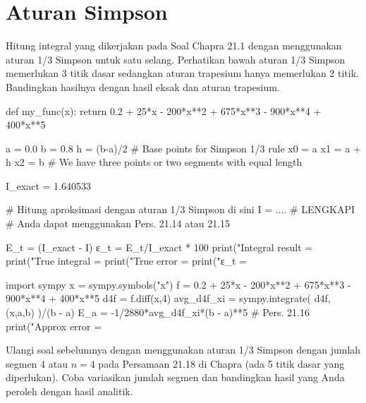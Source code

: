 \section{Aturan Simpson}

\begin{soal}
Hitung integral yang dikerjakan pada Soal Chapra 21.1 dengan menggunakan aturan 1/3 Simpson
untuk satu selang. Perhatikan bawah aturan 1/3 Simpson memerlukan 3 titik dasar sedangkan
aturan trapesium hanya memerlukan 2 titik.
Bandingkan hasilnya dengan hasil eksak dan aturan trapesium.
\end{soal}

\begin{pythoncode}
def my_func(x):
    return 0.2 + 25*x - 200*x**2 + 675*x**3 - 900*x**4 + 400*x**5

a = 0.0
b = 0.8
h = (b-a)/2
# Base points for Simpson 1/3 rule
x0 = a
x1 = a + h
x2 = b
# We have three points or two segments with equal length

I_exact = 1.640533

# Hitung aproksimasi dengan aturan 1/3 Simpson di sini
I = .... # LENGKAPI
# Anda dapat menggunakan Pers. 21.14 atau 21.15

E_t = (I_exact - I)
ε_t = E_t/I_exact * 100
print("Integral result = %
print("True integral   = %
print("True error      = %
print("ε_t             = %

import sympy
x = sympy.symbols("x")
f = 0.2 + 25*x - 200*x**2 + 675*x**3 - 900*x**4 + 400*x**5
d4f = f.diff(x,4)
avg_d4f_xi = sympy.integrate( d4f, (x,a,b) )/(b - a)
E_a = -1/2880*avg_d4f_xi*(b - a)**5 # Pers. 21.16
print("Approx error    = %
\end{pythoncode}

\begin{soal}
Ulangi soal sebelumnya dengan menggunakan aturan 1/3 Simpson dengan
jumlah segmen 4 atau $n = 4$ pada Persamaan 21.18 di Chapra (ada 5 titik
dasar yang diperlukan). Coba variasikan jumlah segmen dan bandingkan
hasil yang Anda peroleh dengan hasil analitik.
\end{soal}

